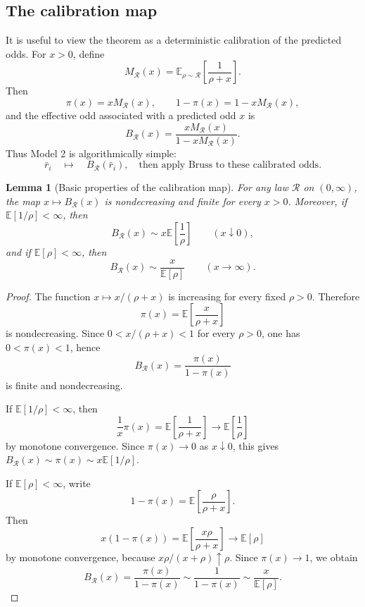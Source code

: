 \documentclass[11pt,a4paper]{article}
\newtheorem{lemma}{Lemma}
\begin{document}
\subsection{The calibration map}

It is useful to view the theorem as a deterministic calibration of the predicted
odds.  For $x>0$, define
\[
  M_{\mathcal R}(x)
  =\mathbb E_{\rho\sim\mathcal R}\left[\frac1{\rho+x}\right].
\]
Then
\[
  \pi(x)=xM_{\mathcal R}(x),
  \qquad
  1-\pi(x)=1-xM_{\mathcal R}(x),
\]
and the effective odd associated with a predicted odd $x$ is
\[
  \boxed{
  B_{\mathcal R}(x)
  =\frac{xM_{\mathcal R}(x)}{1-xM_{\mathcal R}(x)}.
  }
  \tag{15}
\]
Thus Model 2 is algorithmically simple:
\[
  \boxed{
  \bar r_i\quad\longmapsto\quad B_{\mathcal R}(\bar r_i),
  \quad\text{then apply Bruss to these calibrated odds.}
  }
\]

\begin{lemma}[Basic properties of the calibration map]
\label{lem:calibration-properties}
For any law $\mathcal R$ on $(0,\infty)$, the map
$x\mapsto B_{\mathcal R}(x)$ is nondecreasing and finite for every $x>0$.
Moreover, if $\mathbb E[1/\rho]<\infty$, then
\[
  B_{\mathcal R}(x)
  \sim x\mathbb E\left[\frac1\rho\right]
  \qquad (x\downarrow0),
\]
and if $\mathbb E[\rho]<\infty$, then
\[
  B_{\mathcal R}(x)
  \sim \frac{x}{\mathbb E[\rho]}
  \qquad (x\to\infty).
\]
\end{lemma}

\begin{proof}
The function $x\mapsto x/(\rho+x)$ is increasing for every fixed $\rho>0$.
Therefore
\[
  \pi(x)=\mathbb E\left[\frac{x}{\rho+x}\right]
\]
is nondecreasing.  Since $0<x/(\rho+x)<1$ for every $\rho>0$, one has
$0<\pi(x)<1$, hence
\[
  B_{\mathcal R}(x)=\frac{\pi(x)}{1-\pi(x)}
\]
is finite and nondecreasing.

If $\mathbb E[1/\rho]<\infty$, then
\[
  \frac1x\pi(x)
  =\mathbb E\left[\frac1{\rho+x}\right]
  \longrightarrow
  \mathbb E\left[\frac1\rho\right]
\]
by monotone convergence.  Since $\pi(x)\to0$ as $x\downarrow0$, this gives
$B_{\mathcal R}(x)\sim \pi(x)\sim x\mathbb E[1/\rho]$.

If $\mathbb E[\rho]<\infty$, write
\[
  1-\pi(x)=\mathbb E\left[\frac{\rho}{\rho+x}\right].
\]
Then
\[
  x(1-\pi(x))
  =\mathbb E\left[\frac{x\rho}{\rho+x}\right]
  \longrightarrow
  \mathbb E[\rho]
\]
by monotone convergence, because $x\rho/(x+\rho)\uparrow\rho$.  Since
$\pi(x)\to1$, we obtain
\[
  B_{\mathcal R}(x)
  =\frac{\pi(x)}{1-\pi(x)}
  \sim \frac1{1-\pi(x)}
  \sim \frac{x}{\mathbb E[\rho]}.
\]
\end{proof}
\end{document}

